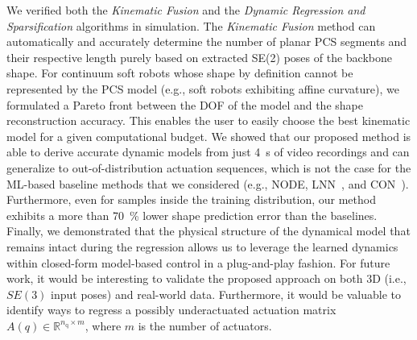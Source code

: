We verified both the \emph{Kinematic Fusion} and the \emph{Dynamic Regression and Sparsification} algorithms in simulation. The \emph{Kinematic Fusion} method can automatically and accurately determine the number of planar \gls{PCS} segments and their respective length purely based on extracted SE(2) poses of the backbone shape. 
For continuum soft robots whose shape by definition cannot be represented by the \gls{PCS} model (e.g., soft robots exhibiting affine curvature), we formulated a Pareto front between the \gls{DOF} of the model and the shape reconstruction accuracy. This enables the user to easily choose the best kinematic model for a given computational budget.
We showed that our proposed method is able to derive accurate dynamic models from just \SI{4}{s} of video recordings and can generalize to out-of-distribution actuation sequences, which is not the case for the \gls{ML}-based baseline methods that we considered (e.g., \gls{NODE}, \gls{LNN}~\citep{liu2024physics}, and \gls{CON}~\citep{stolzle2024input}).
Furthermore, even for samples inside the training distribution, our method exhibits a more than \SI{70}{\percent} lower shape prediction error than the baselines.
Finally, we demonstrated that the physical structure of the dynamical model that remains intact during the regression allows us to leverage the learned dynamics within closed-form model-based control in a plug-and-play fashion.
For future work, it would be interesting to validate the proposed approach on both 3D (i.e., $SE(3)$ input poses) and real-world data. Furthermore, it would be valuable to identify ways to regress a possibly underactuated actuation matrix $A(q) \in \mathbb{R}^{n_\mathrm{q} \times m}$, where $m$ is the number of actuators.